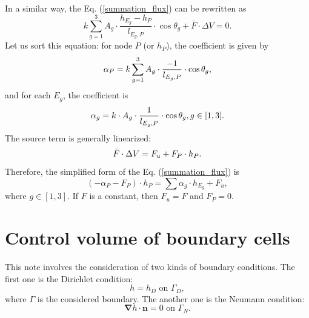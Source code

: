 \documentclass{article}        %
\begin{document}
In a similar way, the Eq. (\ref{summation_flux}) can be rewritten as
\begin{equation}
	k\sum_{g = 1}^{3}A_g \cdot \frac{h_{E_g}-h_P}{l_{E_g,P}}\cdot \cos{\theta_g} + \bar{F}\cdot \Delta V = 0.
\end{equation}
Let us sort this equation: for node $P$ (or $h_P$), the coefficient is given by
\begin{equation}
\alpha_P = k\sum_{g = 1}^{3} A_g\cdot \frac{-1}{l_{E_g, P}}\cdot \cos{\theta_g}, \notag
\end{equation}
and for each $E_g$, the coefficient is
\begin{equation}
	\alpha_g = k \cdot A_g \cdot \frac{1}{l_{E_g, P}} \cdot \cos{\theta_g}, g \in[1,3]. \notag
\end{equation} 
The source term is generally linearized:
\begin{equation}
 \bar{F} \cdot \Delta V = F_u + F_P\cdot h_P. \notag
\end{equation}
Therefore, the simplified form of the Eq. (\ref{summation_flux}) is
\begin{equation}
	(-\alpha_P - F_P)\cdot h_P = \sum \alpha_g \cdot h_{E_g} + F_u,
	\label{simplified_coe}
\end{equation}
where $g \in [1,3]$. If $F$ is a constant, then $F_u = F$ and $F_P = 0$.

\section{Control volume of boundary cells}
This note involves the consideration of two kinds of boundary conditions. The first one is the Dirichlet condition:
\begin{equation}
h = h_D \text{ on } \Gamma_D,	
\end{equation}
where $\Gamma$ is the considered boundary. The another one is the Neumann condition:
\begin{equation}
	\bm{\nabla} h \cdot \bm{n} = 0 \text{ on } \Gamma_N.
\end{equation}
\end{document}
